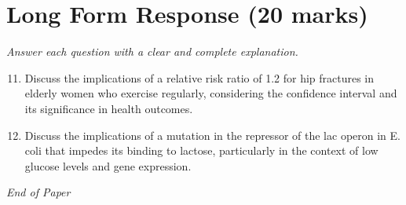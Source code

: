 \documentclass[12pt]{article}
\begin{document}
\section*{Long Form Response (20 marks)}
\textit{Answer each question with a clear and complete explanation.}
\begin{enumerate}[label=\arabic*.]
\setcounter{enumi}{10}
\item Discuss the implications of a relative risk ratio of 1.2 for hip fractures in elderly
women who exercise regularly, considering the confidence interval and its significance in
health outcomes.
\item Discuss the implications of a mutation in the repressor of the lac operon in E. coli that
impedes its binding to lactose, particularly in the context of low glucose levels and gene
expression.
\end{enumerate}

\vfill
\noindent\textit{End of Paper}
\end{document}
